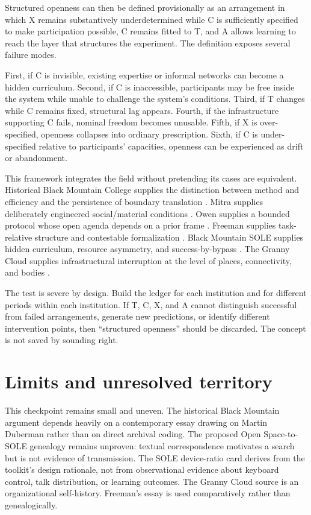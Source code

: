 \documentclass[11pt]{article}
\begin{document}
Structured openness can then be defined provisionally as an arrangement in which X remains substantively underdetermined while C is sufficiently specified to make participation possible, C remains fitted to T, and A allows learning to reach the layer that structures the experiment. The definition exposes several failure modes.

First, if C is invisible, existing expertise or informal networks can become a hidden curriculum. Second, if C is inaccessible, participants may be free inside the system while unable to challenge the system's conditions. Third, if T changes while C remains fixed, structural lag appears. Fourth, if the infrastructure supporting C fails, nominal freedom becomes unusable. Fifth, if X is over-specified, openness collapses into ordinary prescription. Sixth, if C is under-specified relative to participants' capacities, openness can be experienced as drift or abandonment.

This framework integrates the field without pretending its cases are equivalent. Historical Black Mountain College supplies the distinction between method and efficiency and the persistence of boundary translation \cite{disalvo2026blackmountainmess}. Mitra supplies deliberately engineered social/material conditions \cite{mitra_sole_toolkit}. Owen supplies a bounded protocol whose open agenda depends on a prior frame \cite{owen_open_space_guide}. Freeman supplies task-relative structure and contestable formalization \cite{freeman1972tyranny}. Black Mountain SOLE supplies hidden curriculum, resource asymmetry, and success-by-bypass \cite{caplanbricker2013blackmountain}. The Granny Cloud supplies infrastructural interruption at the level of places, connectivity, and bodies \cite{grannycloud_background}.

The test is severe by design. Build the ledger for each institution and for different periods within each institution. If T, C, X, and A cannot distinguish successful from failed arrangements, generate new predictions, or identify different intervention points, then ``structured openness'' should be discarded. The concept is not saved by sounding right.

\section{Limits and unresolved territory}
This checkpoint remains small and uneven. The historical Black Mountain argument depends heavily on a contemporary essay drawing on Martin Duberman rather than on direct archival coding. The proposed Open Space-to-SOLE genealogy remains unproven: textual correspondence motivates a search but is not evidence of transmission. The SOLE device-ratio card derives from the toolkit's design rationale, not from observational evidence about keyboard control, talk distribution, or learning outcomes. The Granny Cloud source is an organizational self-history. Freeman's essay is used comparatively rather than genealogically.
\end{document}
